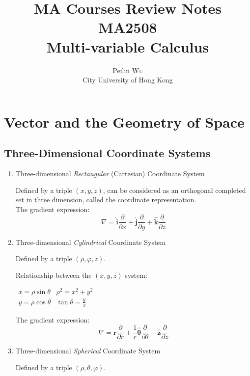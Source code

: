 \documentclass[UTF8,a4paper, 10pt, openany]{svmono}
\title{MA Courses Review Notes\\MA2508\\Multi-variable Calculus}
\author{Peilin \textsc{Wu}\\ City University of Hong Kong
}
\begin{document}
\maketitle
\tableofcontents

\chapter{Vector and the Geometry of Space}
\section{Three-Dimensional Coordinate Systems}
\begin{enumerate}
\item Three-dimensional \emph{Rectangular} (Cartesian) Coordinate System

Defined by a triple $(x, y, z)$, can be considered as an orthogonal completed set in three dimension, called the coordinate representation. \\

The gradient expression:
\begin{equation}
 \boxed{\nabla = \mathbf{\hat{i}}\frac{\partial }{\partial x}+ \bm{\hat{j}} \frac{\partial }{\partial y}+\mathbf{\hat{k}}\frac{\partial }{\partial z}	}
\end{equation}

\item Three-dimensional \emph{Cylindrical} Coordinate System

Defined by a triple $(\rho, \varphi, z)$.

Relationship between the $(x, y, z)$ system:
\begin{center}
$\begin{array}{cc}
x = \rho \sin \theta  &  \rho ^2 = x^2+y^2\\
y = \rho \cos \theta  &  \tan \theta = \frac{y}{x}
\end{array}$
\end{center}

The gradient expression:
\begin{equation}
 \boxed{\nabla = \bm{\hat{r}}\frac{\partial }{\partial r}+\frac{1}{r} \bm{\hat{\theta}}	\frac{\partial }{\partial \theta}+\bm{\hat{z}}\frac{\partial }{\partial z}}
\end{equation}

\item Three-dimensional \emph{Spherical} Coordinate System

Defined by a triple $(\rho, \theta, \varphi)$.


\end{enumerate}
\end{document}

